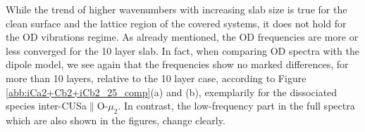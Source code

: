\documentclass[11pt,DIV=13,BCOR=5mm,a4paper,headinclude]{scrbook}
\begin{document}
While the trend of higher wavenumbers with increasing slab size is true for the clean surface and the lattice region of the covered systems, it does not hold for the OD vibrations regime.
As already mentioned, the OD frequencies are more or less converged for the 10 layer slab.
In fact, when comparing OD spectra with the dipole model, we see again that the frequencies show no marked differences, for more than 10 layers, relative to the 10 layer case, according to Figure \ref{abb:iCa2+Cb2+iCb2_25_comp}(a) and (b), exemplarily for the dissociated species inter-CUSa$\parallel$O-$\mu_2$.
In contrast, the low-frequency part in the full spectra which are also shown in the figures, change clearly.
\end{document}
